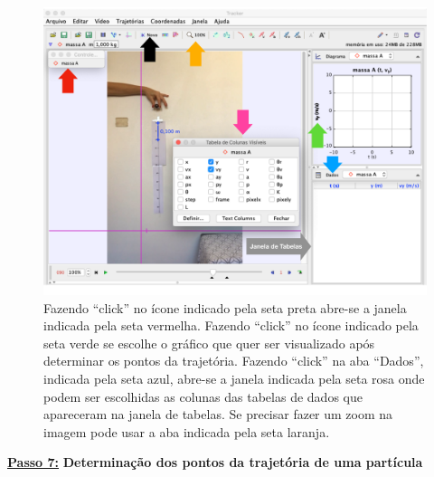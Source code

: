 \begin{minipage}{\linewidth}
      \begin{minipage}{0.37\linewidth}
          \begin{figure}[H]
              \includegraphics[width=\linewidth]{Figuras_exp3/fig8AppB.pdf}
\caption{\label{fig8AppB} Fazendo ``click'' no ícone indicado pela seta preta abre-se a janela indicada pela seta vermelha. Fazendo ``click'' no ícone indicado pela seta verde se escolhe o gráfico que quer ser visualizado 
após determinar os pontos da trajetória. Fazendo ``click'' na aba ``Dados'', indicada pela seta azul, 
abre-se a janela indicada pela seta rosa onde podem ser escolhidas as colunas das tabelas de dados que apareceram na janela de tabelas. Se precisar fazer um zoom na imagem pode usar a aba indicada pela seta laranja.}
          \end{figure}
      \end{minipage}
  \end{minipage}%
  
  
  
\underline{\bf Passo 7:} {\bf Determinação dos pontos da trajetória de uma partícula}\\



